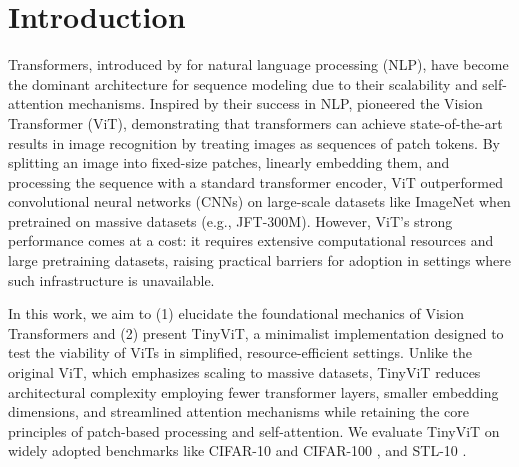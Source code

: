 \section{Introduction}

Transformers, introduced by \cite{vaswani2017attention} for natural language processing (NLP), have become the dominant architecture for sequence modeling due to their scalability and self-attention mechanisms. Inspired by their success in NLP, \cite{alexey2020image} pioneered the Vision Transformer (ViT), demonstrating that transformers can achieve state-of-the-art results in image recognition by treating images as sequences of patch tokens. By splitting an image into fixed-size patches, linearly embedding them, and processing the sequence with a standard transformer encoder, ViT outperformed convolutional neural networks (CNNs) \cite{he2016deep} on large-scale datasets like ImageNet when pretrained on massive datasets (e.g., JFT-300M). However, ViT’s strong performance comes at a cost: it requires extensive computational resources and large pretraining datasets, raising practical barriers for adoption in settings where such infrastructure is unavailable.

In this work, we aim to (1) elucidate the foundational mechanics of Vision Transformers and (2) present TinyViT, a minimalist implementation designed to test the viability of ViTs in simplified, resource-efficient settings. Unlike the original ViT, which emphasizes scaling to massive datasets, TinyViT reduces architectural complexity employing fewer transformer layers, smaller embedding dimensions, and streamlined attention mechanisms while retaining the core principles of patch-based processing and self-attention. We evaluate TinyViT on widely adopted benchmarks like CIFAR-10 and CIFAR-100 \cite{krizhevsky2009learning}, and STL-10 \cite{coates2011analysis}.